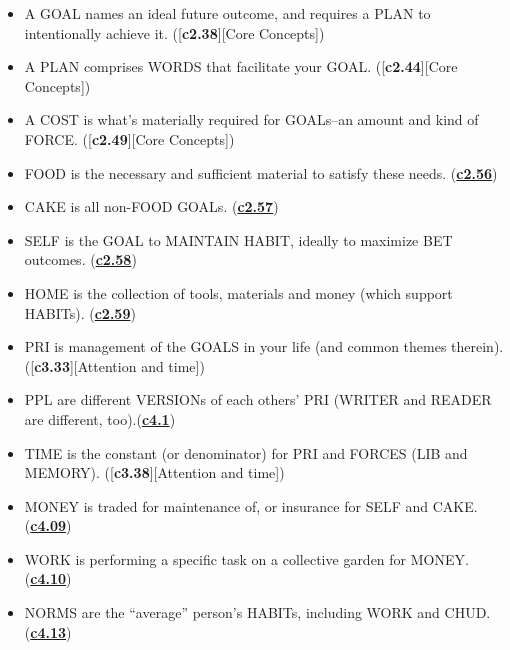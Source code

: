 \documentclass[
]{book}
\providecommand{\tightlist}{%
  \setlength{\itemsep}{0pt}\setlength{\parskip}{0pt}}
\begin{document}
\begin{itemize}
\tightlist
\item
  A GOAL names an ideal future outcome, and requires a PLAN to intentionally achieve it. ({[}\textbf{c2.38}{]}{[}Core Concepts{]})\\
\item
  A PLAN comprises WORDS that facilitate your GOAL. ({[}\textbf{c2.44}{]}{[}Core Concepts{]})\\
\item
  A COST is what's materially required for GOALs--an amount and kind of FORCE. ({[}\textbf{c2.49}{]}{[}Core Concepts{]})\\
\item
  FOOD is the necessary and sufficient material to satisfy these needs. (\protect\hyperlink{self-1}{\textbf{c2.56}})\\
\item
  CAKE is all non-FOOD GOALs. (\protect\hyperlink{self-1}{\textbf{c2.57}})\\
\item
  SELF is the GOAL to MAINTAIN HABIT, ideally to maximize BET outcomes. (\protect\hyperlink{self-1}{\textbf{c2.58}})\\
\item
  HOME is the collection of tools, materials and money (which support HABITs). (\protect\hyperlink{home}{\textbf{c2.59}})\\
\item
  PRI is management of the GOALS in your life (and common themes therein). ({[}\textbf{c3.33}{]}{[}Attention and time{]})\\
\item
  PPL are different VERSIONs of each others' PRI (WRITER and READER are different, too).(\protect\hyperlink{ppl}{\textbf{c4.1}})\\
\item
  TIME is the constant (or denominator) for PRI and FORCES (LIB and MEMORY). ({[}\textbf{c3.38}{]}{[}Attention and time{]})\\
\item
  MONEY is traded for maintenance of, or insurance for SELF and CAKE. (\protect\hyperlink{ppl}{\textbf{c4.09}})\\
\item
  WORK is performing a specific task on a collective garden for MONEY. (\protect\hyperlink{work}{\textbf{c4.10}})\\
\item
  NORMS are the ``average'' person's HABITs, including WORK and CHUD. (\protect\hyperlink{work}{\textbf{c4.13}})\\

\end{itemize}
\end{document}
